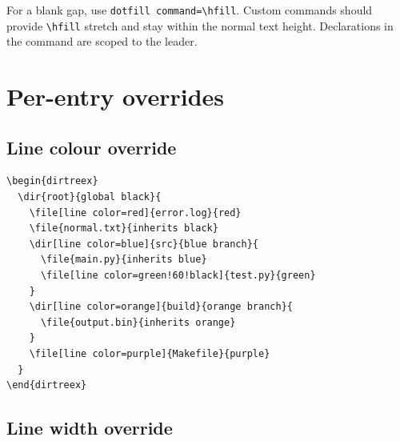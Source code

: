 \documentclass[11pt]{article}
\begin{document}
\begin{dirtreex}[
  dotfill color=purple,
  dotfill command={%
    \cleaders\hbox to 0.8em{%
      \hss\rule[0.4ex]{0.4em}{0.4pt}\hss}%
    \hfill\kern0pt}]
\end{dirtreex}

For a blank gap, use \verb|dotfill command=\hfill|. Custom commands should
provide \verb|\hfill| stretch and stay within the normal text height.
Declarations in the command are scoped to the leader.

\clearpage

\section{Per-entry overrides}

\subsection{Line colour override}

\begin{Verbatim}
\begin{dirtreex}
  \dir{root}{global black}{
    \file[line color=red]{error.log}{red}
    \file{normal.txt}{inherits black}
    \dir[line color=blue]{src}{blue branch}{
      \file{main.py}{inherits blue}
      \file[line color=green!60!black]{test.py}{green}
    }
    \dir[line color=orange]{build}{orange branch}{
      \file{output.bin}{inherits orange}
    }
    \file[line color=purple]{Makefile}{purple}
  }
\end{dirtreex}
\end{Verbatim}

\begin{dirtreex}
\end{dirtreex}

\subsection{Line width override}
\end{document}
